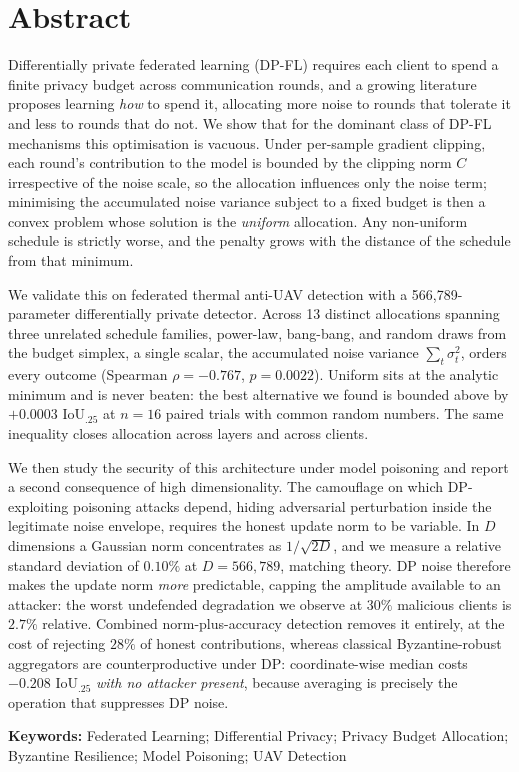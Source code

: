 \section*{Abstract}

Differentially private federated learning (DP-FL) requires each client to spend a
finite privacy budget across communication rounds, and a growing literature
proposes learning \emph{how} to spend it, allocating more noise to rounds that
tolerate it and less to rounds that do not. We show that for the dominant class
of DP-FL mechanisms this optimisation is vacuous. Under per-sample gradient
clipping, each round's contribution to the model is bounded by the clipping norm
$C$ irrespective of the noise scale, so the allocation influences only the noise
term; minimising the accumulated noise variance subject to a fixed budget is then
a convex problem whose solution is the \emph{uniform} allocation. Any non-uniform
schedule is strictly worse, and the penalty grows with the distance of the
schedule from that minimum.

We validate this on federated thermal anti-UAV detection with a
566,789-parameter differentially private detector. Across 13 distinct
allocations spanning three unrelated schedule families, power-law, bang-bang,
and random draws from the budget simplex, a single scalar, the accumulated noise
variance $\sum_t\sigma_t^2$, orders every outcome (Spearman $\rho=-0.767$,
$p=0.0022$). Uniform sits at the analytic minimum and is never beaten: the best
alternative we found is bounded above by $+0.0003$ IoU$_{.25}$ at $n{=}16$ paired
trials with common random numbers. The same inequality closes allocation across
layers and across clients.

We then study the security of this architecture under model poisoning and report
a second consequence of high dimensionality. The camouflage on which
DP-exploiting poisoning attacks depend, hiding adversarial perturbation inside
the legitimate noise envelope, requires the honest update norm to be variable.
In $D$ dimensions a Gaussian norm concentrates as $1/\sqrt{2D}$, and we measure a
relative standard deviation of $0.10\%$ at $D=566{,}789$, matching theory. DP
noise therefore makes the update norm \emph{more} predictable, capping the
amplitude available to an attacker: the worst undefended degradation we observe
at $30\%$ malicious clients is $2.7\%$ relative. Combined norm-plus-accuracy
detection removes it entirely, at the cost of rejecting $28\%$ of honest
contributions, whereas classical Byzantine-robust aggregators are
counterproductive under DP: coordinate-wise median costs $-0.208$ IoU$_{.25}$
\emph{with no attacker present}, because averaging is precisely the operation
that suppresses DP noise.

\vspace{1cm}
\textbf{Keywords:} Federated Learning; Differential Privacy; Privacy Budget
Allocation; Byzantine Resilience; Model Poisoning; UAV Detection
\pagebreak
